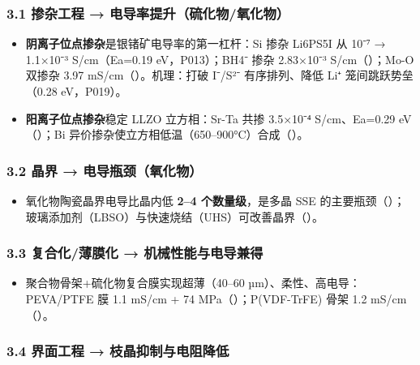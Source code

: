 \documentclass[12pt,a4paper]{ctexart}
\providecommand{\tightlist}{%
  \setlength{\itemsep}{0pt}\setlength{\parskip}{0pt}}
\begin{document}
\subsubsection{3.1 掺杂工程 → 电导率提升（硫化物/氧化物）}\label{ux63baux6742ux5de5ux7a0b-ux7535ux5bfcux7387ux63d0ux5347ux786bux5316ux7269ux6c27ux5316ux7269}

\begin{itemize}
\tightlist
\item
  \textbf{阴离子位点掺杂}是银锗矿电导率的第一杠杆：Si 掺杂 Li6PS5I 从 10⁻⁷ → 1.1×10⁻³ S/cm（Ea=0.19 eV，P013）；BH4⁻ 掺杂 2.83×10⁻³ S/cm（\cite{P020}）；Mo-O 双掺杂 3.97 mS/cm（\cite{P024}）。机理：打破 I⁻/S²⁻ 有序排列、降低 Li⁺ 笼间跳跃势垒（0.28 eV，P019）。
\item
  \textbf{阳离子位点掺杂}稳定 LLZO 立方相：Sr-Ta 共掺 3.5×10⁻⁴ S/cm、Ea=0.29 eV（\cite{P010}）；Bi 异价掺杂使立方相低温（650--900°C）合成（\cite{P011}）。
\end{itemize}

\subsubsection{3.2 晶界 → 电导瓶颈（氧化物）}\label{ux6676ux754c-ux7535ux5bfcux74f6ux9888ux6c27ux5316ux7269}

\begin{itemize}
\tightlist
\item
  氧化物陶瓷晶界电导比晶内低 \textbf{2--4 个数量级}，是多晶 SSE 的主要瓶颈（\cite{P072}）；玻璃添加剂（LBSO）与快速烧结（UHS）可改善晶界（\cite{P041,P055}）。
\end{itemize}

\subsubsection{3.3 复合化/薄膜化 → 机械性能与电导兼得}\label{ux590dux5408ux5316ux8584ux819cux5316-ux673aux68b0ux6027ux80fdux4e0eux7535ux5bfcux517cux5f97}

\begin{itemize}
\tightlist
\item
  聚合物骨架+硫化物复合膜实现超薄（40--60 µm）、柔性、高电导：PEVA/PTFE 膜 1.1 mS/cm + 74 MPa（\cite{P043}）；P(VDF-TrFE) 骨架 1.2 mS/cm（\cite{P026}）。
\end{itemize}

\subsubsection{3.4 界面工程 → 枝晶抑制与电阻降低}\label{ux754cux9762ux5de5ux7a0b-ux679dux6676ux6291ux5236ux4e0eux7535ux963bux964dux4f4e}
\end{document}
